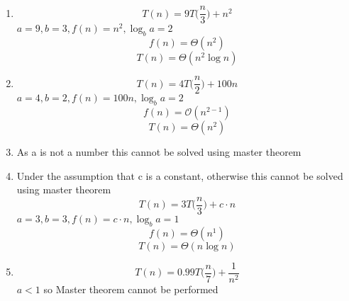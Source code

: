 \documentclass{article}[18pt]
\begin{document}
\section{}
\begin{enumerate}[label=(\alph*)]
	\item 
	$$T(n)=9T\bigg(\dfrac{n}{3}\bigg)+n^2$$
	$a=9, b=3, f(n)=n^2, \log_ba=2$
	$$f(n)=\Theta(n^2)$$
	$$T(n)=\Theta(n^2\log n)$$
	\item 
	$$T(n)=4T\bigg(\dfrac{n}{2}\bigg)+100n$$
	$a=4,b=2,f(n)=100n, \log_ba=2$
	$$f(n)=\mathcal{O}(n^{2-1})$$
	$$T(n)=\Theta(n^2)$$
	\item As a is not a number this cannot be solved using master theorem
	\item 
	Under the assumption that c is a constant, otherwise this cannot be solved using master theorem
	$$T(n)=3T\bigg(\dfrac{n}{3}\bigg)+c\cdot n$$
	$a=3,b=3,f(n)=c\cdot n,\log_ba=1$	
	$$f(n)=\Theta(n^1)$$
	$$T(n)=\Theta(n\log n)$$
	\item 
	$$T(n)=0.99T\bigg(\dfrac{n}{7}\bigg)+\dfrac{1}{n^2}$$
	$a<1$ so Master theorem cannot be performed
\end{enumerate}
\newpage
\end{document}
